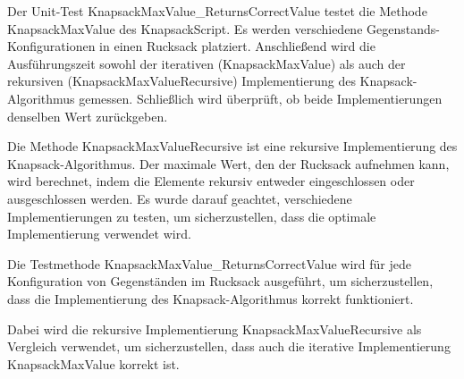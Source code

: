 Der Unit-Test KnapsackMaxValue_ReturnsCorrectValue testet die Methode KnapsackMaxValue des KnapsackScript. Es werden
verschiedene Gegenstands-Konfigurationen in einen Rucksack platziert. Anschließend wird die Ausführungszeit sowohl der
iterativen (KnapsackMaxValue) als auch der rekursiven (KnapsackMaxValueRecursive) Implementierung des Knapsack-Algorithmus
gemessen. Schließlich wird überprüft, ob beide Implementierungen denselben Wert zurückgeben.

Die Methode KnapsackMaxValueRecursive ist eine rekursive Implementierung des Knapsack-Algorithmus. Der maximale Wert, den
der Rucksack aufnehmen kann, wird berechnet, indem die Elemente rekursiv entweder eingeschlossen oder ausgeschlossen werden.
Es wurde darauf geachtet, verschiedene Implementierungen zu testen, um sicherzustellen, dass die optimale Implementierung verwendet wird.

Die Testmethode KnapsackMaxValue_ReturnsCorrectValue wird für jede Konfiguration von Gegenständen im Rucksack ausgeführt,
um sicherzustellen, dass die Implementierung des Knapsack-Algorithmus korrekt funktioniert.

Dabei wird die rekursive Implementierung KnapsackMaxValueRecursive als Vergleich verwendet, um sicherzustellen, dass
auch die iterative Implementierung KnapsackMaxValue korrekt ist.


